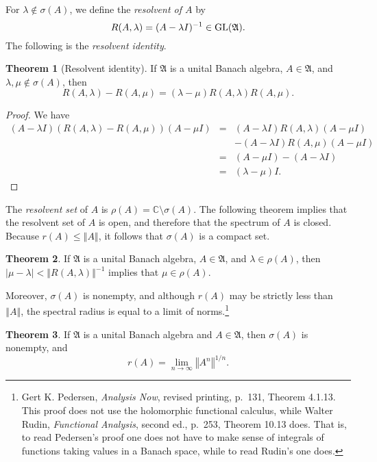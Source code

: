 \documentclass{article}
\newcommand{\GL}{\ensuremath\mathrm{GL}}
\newcommand{\norm}[1]{\left\Vert #1 \right\Vert}
\theoremstyle{definition}
\newtheorem{theorem}{Theorem}
\theoremstyle{definition}
\begin{document}
 
For $\lambda \not \in \sigma(A)$, we define the {\em resolvent of $A$} by 
\[
R(A,\lambda)=(A-\lambda I)^{-1} \in \GL(\mathfrak{A}).
\]
The following is the {\em resolvent identity}.

\begin{theorem}[Resolvent identity]
If $\mathfrak{A}$ is a unital Banach algebra, $A \in \mathfrak{A}$, and $\lambda,\mu \not \in \sigma(A)$, then
\[
R(A,\lambda)-R(A,\mu) = (\lambda-\mu)R(A,\lambda)R(A,\mu).
\]
\label{resolvent}
\end{theorem}
\begin{proof}
We have
\begin{eqnarray*}
(A-\lambda I)(R(A,\lambda)-R(A,\mu))(A-\mu I)&=&(A-\lambda I)R(A,\lambda)(A-\mu I)\\
&&-(A-\lambda I)R(A,\mu)(A-\mu I)\\
&=&(A-\mu I)-(A-\lambda I)\\
&=&(\lambda -\mu)I.
\end{eqnarray*}
\end{proof}

The {\em resolvent set} of $A$ is $\rho(A)=\mathbb{C} \setminus \sigma(A)$.
The following theorem implies that the resolvent set of $A$ is  open, and therefore that the spectrum
of $A$ is  closed. Because $r(A) \leq \norm{A}$, it follows that $\sigma(A)$ is a compact set.

\begin{theorem}
If $\mathfrak{A}$ is a unital Banach algebra, $A \in \mathfrak{A}$, and $\lambda \in \rho(A)$, then $|\mu-\lambda| < \norm{R(A,\lambda)}^{-1}$
implies that $\mu \in \rho(A)$.
\label{open}
\end{theorem}


Moreover, $\sigma(A)$ is nonempty, and although $r(A)$ may be strictly less than $\norm{A}$, the spectral
radius  is equal to a limit of
norms.\footnote{Gert K. Pedersen, {\em Analysis Now}, revised printing, p.~131, Theorem 4.1.13. This proof does not use the holomorphic functional
calculus, while Walter Rudin, {\em Functional Analysis}, second ed., p.~253, Theorem 10.13 does. That is, to read Pedersen's proof one does
not have to make sense of   integrals of functions taking values in a Banach space, while to read Rudin's one does.}

\begin{theorem}
If $\mathfrak{A}$ is a unital Banach algebra and $A \in \mathfrak{A}$, then
 $\sigma(A)$ is  nonempty, and
\[
r(A) = \lim_{n \to \infty} \norm{A^n}^{1/n}.
\]
\end{theorem}
\end{document}
